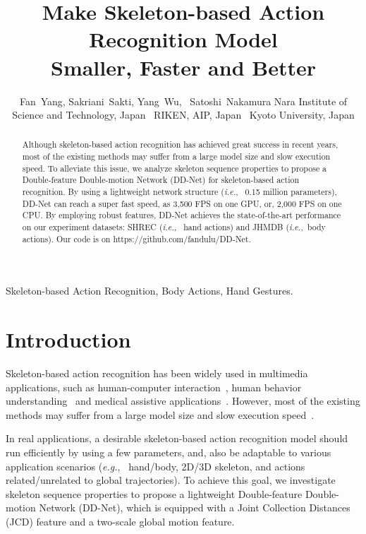 \documentclass[journal]{IEEEtran}
\newcommand{\ie}{{\it i.e.}}
\newcommand{\eg}{{\it e.g.}}
\begin{document}
\title{Make Skeleton-based Action Recognition Model \\Smaller, Faster and Better}

\author{Fan~Yang,
        Sakriani~Sakti,
        Yang~Wu,
        ~Satoshi~Nakamura
\newline
         Nara Institute of Science and Technology, Japan~
         RIKEN, AIP, Japan~
         Kyoto University, Japan}



\maketitle

\begin{abstract}
Although skeleton-based action recognition has achieved great success in recent years, most of the existing methods may suffer from a large model size and slow execution speed. To alleviate this issue, we analyze skeleton sequence properties to propose a Double-feature Double-motion Network (DD-Net) for skeleton-based action recognition. By using a lightweight network structure (\ie,~ 0.15 million parameters), DD-Net can reach a super fast speed, as 3,500 FPS on one GPU, or, 2,000 FPS on one CPU. By employing robust features, DD-Net achieves the state-of-the-art performance on our experiment datasets: SHREC (\ie,~ hand actions) and JHMDB (\ie,~body actions). Our code is on https://github.com/fandulu/DD-Net.
\end{abstract}

\begin{IEEEkeywords}
Skeleton-based Action Recognition, Body Actions, Hand Gestures.
\end{IEEEkeywords}


\IEEEpeerreviewmaketitle

\section{Introduction}

Skeleton-based action recognition has been widely used in multimedia applications, such as human-computer interaction~\cite{ren2011robust}, human behavior understanding~\cite{wei2014skeleton} and medical assistive applications~\cite{chang2011kinect}. However, most of the existing methods may suffer from a large model size and slow execution speed~\cite{de2017shrec, devineau2018convolutional, hou2018spatial, zolfaghari2017chained, choutas2018potion}. 

In real applications, a desirable skeleton-based action recognition model should run efficiently by using a few parameters, and, also be adaptable to various application scenarios (\eg,~ hand/body, 2D/3D skeleton, and actions related/unrelated to global trajectories). To achieve this goal, we investigate skeleton sequence properties to propose a lightweight Double-feature Double-motion Network (DD-Net), which is equipped with a Joint Collection Distances (JCD) feature and a two-scale global motion feature.
\end{document}
